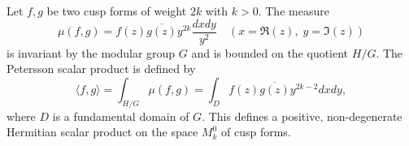 Let $f, g$ be two cusp forms of weight $2k$ with $k > 0$. The measure
$$\mu(f,g) = f(z)\overline{g(z)} y^{2k} \frac{dxdy}{y^2} \quad (x = \Re(z),\; y = \Im(z))$$
is invariant by the modular group $G$ and is bounded on the quotient $H/G$. The Petersson scalar product is defined by
$$\langle f, g \rangle = \int_{H/G} \mu(f, g) = \int_{D} f(z)\overline{g(z)} y^{2k-2} dxdy,$$
where $D$ is a fundamental domain of $G$. This defines a positive, non-degenerate Hermitian scalar product on the space $M_k^0$ of cusp forms.
